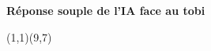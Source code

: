 \documentclass[preview, border=0pt, varwidth=false]{standalone}
\begin{document}
	\setgounit{0.6cm} 
	
\parbox[c][14.65cm][c]{10.2cm}{
	\centering
	
	{\Large\textbf{Réponse souple de l'IA face au tobi }}
	\vspace{3em}
	
	\begin{psgopartialboard}{(1,1)(9,7)}
		\pass
	\end{psgopartialboard}
	
	\vspace{1em}
}
\end{document}
